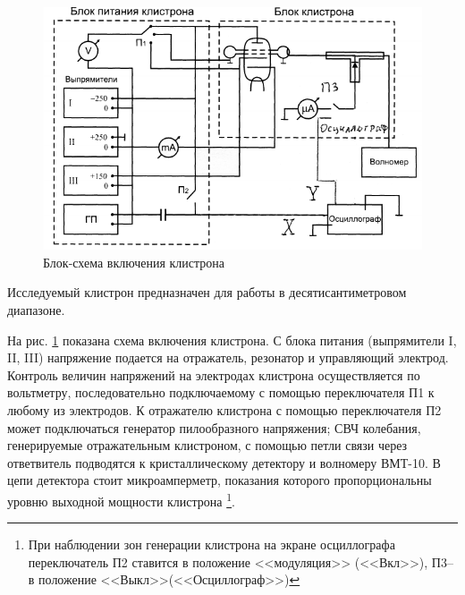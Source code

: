 \begin{figure}[H]
	\centering
	\includegraphics[width=\textwidth]{text/fig4}
	\caption{ Блок-схема включения клистрона}
	\label{fig:4}
\end{figure}

Исследуемый клистрон предназначен для работы в десятисантиметровом диапазоне.

На рис. \ref{fig:4} показана схема включения клистрона. С блока питания (выпрямители I, II, III) напряжение подается на отражатель, резонатор и управляющий электрод. Контроль величин напряжений на электродах клистрона осуществляется по вольтметру, последовательно подключаемому с помощью
переключателя П1 к любому из электродов. К отражателю клистрона с по­мощью переключателя П2 может подключаться генератор пилообразного
напряжения; СВЧ колебания, генерируемые отражательным клистроном, с помощью петли связи через ответвитель подводятся к кристаллическому
детектору и волномеру ВМТ-10. В цепи детектора стоит микроамперметр, показания которого пропорциональны уровню выходной мощности клистрона
\footnote{При наблюдении зон генерации клистрона на экране осциллографа переключатель П2 ставится  в положение <<модуляция>> (<<Вкл>>), П3--в положение <<Выкл>>(<<Осциллограф>>)}.

